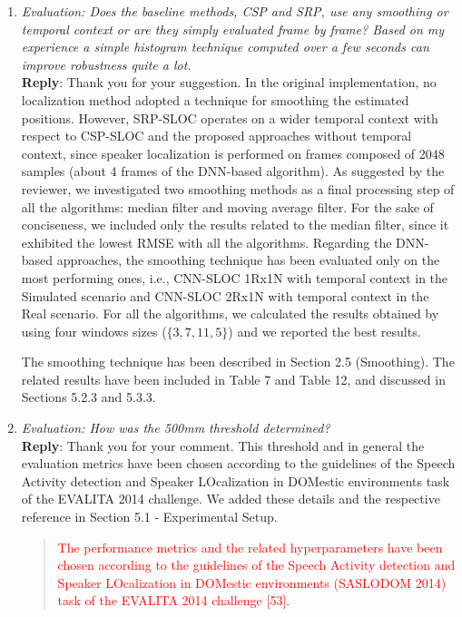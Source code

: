 \documentclass[11pt, technote, letterpaper, oneside, onecolumn]{IEEEtran}
\begin{document}
\begin{enumerate}
\item \textit{Evaluation: Does the baseline methods, CSP and SRP, use any smoothing or temporal context or are they simply evaluated frame by frame? Based on my experience a simple histogram technique computed over a few seconds can improve robustness quite a lot.\\} \label{resp:smooth}
\textbf{Reply}: Thank you for your suggestion. In the original implementation, no localization method adopted a technique for smoothing the estimated positions. However, SRP-SLOC operates on a wider temporal context with respect to CSP-SLOC and the proposed approaches without temporal context, since speaker localization is performed on frames composed of 2048 samples (about 4 frames of the DNN-based algorithm). As suggested by the reviewer, we investigated two smoothing methods as a final processing step of all the algorithms: median filter and moving average filter. For the sake of conciseness, we included only the results related to the median filter, since it exhibited the lowest RMSE with all the algorithms. Regarding the DNN-based approaches, the smoothing technique has been evaluated only on the most performing ones, i.e., CNN-SLOC 1Rx1N with temporal context in the Simulated scenario and CNN-SLOC 2Rx1N with temporal context in the Real scenario. For all the algorithms, we calculated the results obtained by using four windows sizes ($\{3,7,11,5\}$) and we reported the best results.

The smoothing technique has been described in Section 2.5 (Smoothing). The related results have been included in Table 7 and Table 12, and discussed in Sections 5.2.3 and 5.3.3.

\item \textit{Evaluation: How was the 500mm threshold determined?\\}
\textbf{Reply}: Thank you for your comment. This threshold and in general the evaluation metrics have been chosen according to the guidelines of the Speech Activity detection and Speaker LOcalization in DOMestic environments task of the EVALITA 2014 challenge. We added these details and the respective reference in Section 5.1 - Experimental Setup.
\begin{quote}
	\textcolor{red}{The performance metrics and the related hyperparameters have been chosen according to the guidelines of the Speech Activity detection and Speaker LOcalization in DOMestic environments (SASLODOM 2014) task of the EVALITA 2014 challenge [53].}
\end{quote}


\end{enumerate}
\end{document}

